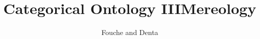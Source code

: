 \documentclass{amsart}
\author{Fouche and Denta}
\title{Categorical Ontology III}
\title{Mereology}
\begin{document}
\section{}
\end{document}
